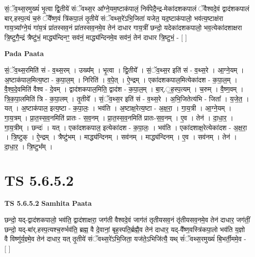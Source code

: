 \documentclass[17pt]{extarticle}
\begin{document}
सं॒ॅव॒थ्स॒रमुख्यं॑ भृ॒त्वा द्वि॒तीये॑ संॅवथ्स॒र आ᳚ग्ने॒यम॒ष्टाक॑पालं॒ निर्व॑पेदै॒न्द्र-मेका॑दशकपालं ॅवैश्वदे॒वं द्वाद॑शकपालं बार्.हस्प॒त्यं च॒रुं ॅवै᳚ष्ण॒वं त्रि॑कपा॒लं तृ॒तीये॑ संॅवथ्स॒रे॑ऽभि॒जिता॑ यजेत॒ यद॒ष्टाक॑पालो॒ भव॑त्य॒ष्टाक्ष॑रा गाय॒त्र्या᳚ग्ने॒यं गा॑य॒त्रं प्रा॑तस्सव॒नं प्रा॑तस्सव॒नमे॒व तेन॑ दाधार गाय॒त्रीं छन्दो॒ यदेका॑दशकपालो॒ भव॒त्येका॑दशाक्षरा त्रि॒ष्टुगै॒न्द्रं त्रैष्टु॑भं॒ माद्ध्य॑न्दिनꣳ॒॒ सव॑नं॒ माद्ध्य॑न्दिनमे॒व सव॑नं॒ तेन॑ दाधार त्रि॒ष्टुभं॒ - [  ] \newline

\textbf{Pada Paata} \newline

सं॒ॅव॒थ्स॒रमिति॑ सं - व॒थ्स॒रम् । उख्य᳚म् । भृ॒त्वा । द्वि॒तीये᳚ । सं॒ॅव॒थ्स॒र इति॑ सं - व॒थ्स॒रे । आ॒ग्ने॒यम् । अ॒ष्टाक॑पाल॒मित्य॒ष्टा - क॒पा॒ल॒म् । निरिति॑ । व॒पे॒त् । ऐ॒न्द्रम् । एका॑दशकपाल॒मित्येका॑दश - क॒पा॒ल॒म् । वै॒श्व॒दे॒वमिति॑ वैश्व - दे॒वम् । द्वाद॑शकपाल॒मिति॒ द्वाद॑श - क॒पा॒ल॒म् । बा॒र्.॒ह॒स्प॒त्यम् । च॒रुम् । वै॒ष्ण॒वम् । त्रि॒क॒पा॒लमिति॑ त्रि - क॒पा॒लम् । तृ॒तीये᳚ । सं॒ॅव॒थ्स॒र इति॑ सं - व॒थ्स॒रे । अ॒भि॒जितेत्य॑भि - जिता᳚ । य॒जे॒त॒ । यत् । अ॒ष्टाक॑पाल॒ इत्य॒ष्टा - क॒पा॒लः॒ । भव॑ति । अ॒ष्टाक्ष॒रेत्य॒ष्टा - अ॒क्ष॒रा॒ । गा॒य॒त्री । आ॒ग्ने॒यम् । गा॒य॒त्रम् । प्रा॒त॒स्स॒व॒नमिति॑ प्रातः - स॒व॒नम् । प्रा॒त॒स्स॒व॒नमिति॑ प्रातः-स॒व॒नम् । ए॒व । तेन॑ । दा॒धा॒र॒ । गा॒य॒त्रीम् । छन्दः॑ । यत् । एका॑दशकपाल॒ इत्येका॑दश - क॒पा॒लः॒ । भव॑ति । एका॑दशाक्ष॒रेत्येका॑दश - अ॒क्ष॒रा॒ । त्रि॒ष्टुक् । ऐ॒न्द्रम् । त्रैष्टु॑भम् । माद्ध्य॑न्दिनम् । सव॑नम् । माद्ध्य॑न्दिनम् । ए॒व । सव॑नम् । तेन॑ । दा॒धा॒र॒ । त्रि॒ष्टुभ᳚म् ।  \newline





\section{ TS 5.6.5.2 }

\textbf{TS 5.6.5.2 } \newline
\textbf{Samhita Paata} \newline

छन्दो॒ यद्-द्वाद॑शकपालो॒ भव॑ति॒ द्वाद॑शाक्षरा॒ जग॑ती वैश्वदे॒वं जाग॑तं तृतीयसव॒नं तृ॑तीयसव॒नमे॒व तेन॑ दाधार॒ जग॑तीं॒ छन्दो॒ यद्-बा॑र्.हस्प॒त्यश्च॒रुर्भव॑ति॒ ब्रह्म॒ वै दे॒वानां॒ बृह॒स्पति॒र्ब्रह्मै॒व तेन॑ दाधार॒ यद्-वै᳚ष्ण॒वस्त्रि॑कपा॒लो भव॑ति य॒ज्ञो वै विष्णु॑र्य॒ज्ञ्मे॒व तेन॑ दाधार॒ यत् तृ॒तीये॑ संॅवथ्स॒रे॑ऽभि॒जिता॒ यज॑ते॒ऽभिजि॑त्यै॒ यथ् सं॑ॅवथ्स॒रमुख्यं॑ बि॒भर्ती॒ममे॒व - [  ] \newline
\end{document}
